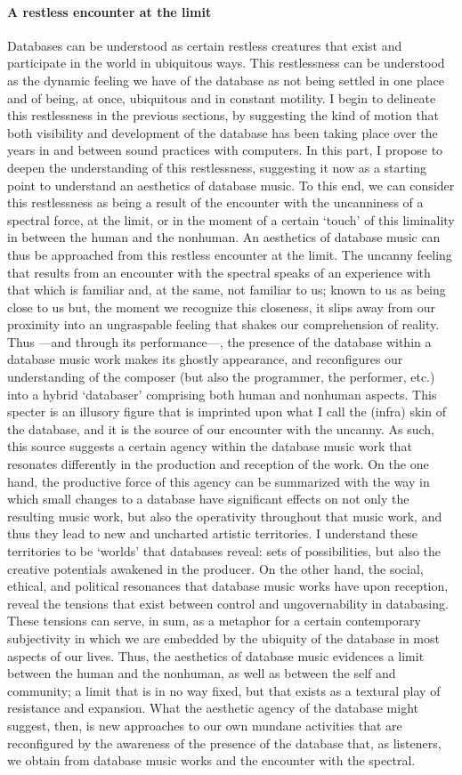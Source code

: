\paragraph{A restless encounter at the limit}
Databases can be understood as certain restless creatures that exist and participate in the world in ubiquitous ways. This restlessness can be understood as the dynamic feeling we have of the database as not being settled in one place and of being, at once, ubiquitous and in constant motility. I begin to delineate this restlessness in the previous sections, by suggesting the kind of motion that both visibility and development of the database has been taking place over the years in and between sound practices with computers. In this part, I propose to deepen the understanding of this restlessness, suggesting it now as a starting point to understand an aesthetics of database music. To this end, we can consider this restlessness as being a result of the encounter with the uncanniness of a spectral force, at the limit, or in the moment of a certain `touch' of this liminality in between the human and the nonhuman. An aesthetics of database music can thus be approached from this restless encounter at the limit. The uncanny feeling that results from an encounter with the spectral speaks of an experience with that which is familiar and, at the same, not familiar to us; known to us as being close to us but, the moment we recognize this closeness, it slips away from our proximity into an ungraspable feeling that shakes our comprehension of reality. Thus ---and through its performance---, the presence of the database within a database music work makes its ghostly appearance, and reconfigures our understanding of the composer (but also the programmer, the performer, etc.) into a hybrid `databaser' comprising both human and nonhuman aspects. This specter is an illusory figure that is imprinted upon what I call the (infra) skin of the database, and it is the source of our encounter with the uncanny. As such, this source suggests a certain agency within the database music work that resonates differently in the production and reception of the work. On the one hand, the productive force of this agency can be summarized with the way in which small changes to a database have significant effects on not only the resulting music work, but also the operativity throughout that music work, and thus they lead to new and uncharted artistic territories. I understand these territories to be `worlds' that databases reveal: sets of possibilities, but also the creative potentials awakened in the producer. On the other hand, the social, ethical, and political resonances that database music works have upon reception, reveal the tensions that exist between control and ungovernability in databasing. These tensions can serve, in sum, as a metaphor for a certain contemporary subjectivity in which we are embedded by the ubiquity of the database in most aspects of our lives. Thus, the aesthetics of database music evidences a limit between the human and the nonhuman, as well as between the self and community; a limit that is in no way fixed, but that exists as a textural play of resistance and expansion. What the aesthetic agency of the database might suggest, then, is new approaches to our own mundane activities that are reconfigured by the awareness of the presence of the database that, as listeners, we obtain from database music works and the encounter with the spectral. 


